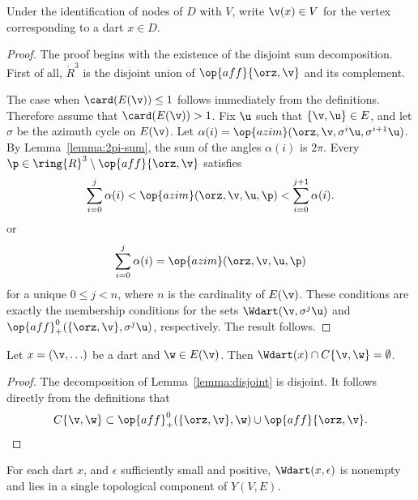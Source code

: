 \begin{definition}
Under the identification of nodes of $D$ with $V$,
write $\v(x)\in V$ for the vertex corresponding to a dart $x\in D$. 
\end{definition}

\begin{proof}
The proof begins with the existence of the disjoint sum decomposition.
First of all, $\ring{R}^3$ is the disjoint union of $\op{aff}\{\orz,\v\}$
and its complement.

The case when $\card(E(\v))\le 1$ follows immediately from the definitions.  
Therefore assume  that $\card(E(\v)) >1$.
Fix $\u$ such that $\{\v,\u\}\in E$, and let $\sigma$ be the azimuth
cycle on $E(\v)$.  Let $\alpha(i)=\op{azim}(\orz,\v,\sigma^i \u,\sigma^{i+1}\u)$.   By Lemma~\ref{lemma:2pi-sum}, the sum of the angles $\alpha(i)$ is $2\pi$.  Every $\p\in\ring{R}^3\setminus\op{aff}\{\orz,\v\}$ satisfies
$$
\sum_{i=0}^j \alpha(i) <
\op{azim}(\orz,\v,\u,\p) < \sum_{i=0}^{j+1} \alpha(i).
$$
or 
$$
\sum_{i=0}^j \alpha(i) = \op{azim}(\orz,\v,\u,\p)
$$
for a unique $0 \le j < n$, where $n$ is the cardinality of $E(\v)$. 
These conditions are exactly the membership conditions for the sets
$
\Wdart(\v,\sigma^j \u)
$
and $\op{aff}_+^0(\{\orz,\v\},\sigma^j \u)$, respectively.
The result follows.
\end{proof}

\begin{corollary}
Let $x = (\v,\ldots)$ be a dart and $\w\in E(\v)$.
Then $\Wdart(x)\cap C\{\v,\w\}=\emptyset$.
\end{corollary}

\begin{proof} The decomposition of Lemma~\ref{lemma:disjoint} is
disjoint.  It follows directly from the definitions that
   $$C\{\v,\w\}\subset \op{aff}_+^0(\{\orz,\v\},\w) \cup 
    \op{aff}\{\orz,\v\}.$$
\end{proof}

\begin{lemma} 
For each dart $x$, and $\epsilon$ sufficiently small and positive,
$\Wdart(x,\epsilon)$ is nonempty and lies in a single 
topological component of $Y(V,E)$.
\end{lemma}
%
%

